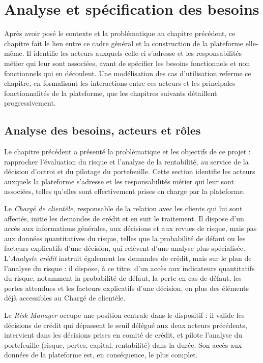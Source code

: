 \chapter{Analyse et spécification des besoins}

Après avoir posé le contexte et la problématique au chapitre précédent, ce chapitre fait le lien entre ce cadre général et la construction de la plateforme elle-même. Il identifie les acteurs auxquels celle-ci s'adresse et les responsabilités métier qui leur sont associées, avant de spécifier les besoins fonctionnels et non fonctionnels qui en découlent. Une modélisation des cas d'utilisation referme ce chapitre, en formalisant les interactions entre ces acteurs et les principales fonctionnalités de la plateforme, que les chapitres suivants détaillent progressivement.

\section{Analyse des besoins, acteurs et rôles}

Le chapitre précédent a présenté la problématique et les objectifs de ce projet : rapprocher l'évaluation du risque et l'analyse de la rentabilité, au service de la décision d'octroi et du pilotage du portefeuille. Cette section identifie les acteurs auxquels la plateforme s'adresse et les responsabilités métier qui leur sont associées, telles qu'elles sont effectivement prises en charge par la plateforme.

Le \emph{Chargé de clientèle}, responsable de la relation avec les clients qui lui sont affectés, initie les demandes de crédit et en suit le traitement. Il dispose d'un accès aux informations générales, aux décisions et aux revues de risque, mais pas aux données quantitatives du risque, telles que la probabilité de défaut ou les facteurs explicatifs d'une décision, qui relèvent d'une analyse plus spécialisée. L'\emph{Analyste crédit} instruit également les demandes de crédit, mais sur le plan de l'analyse du risque : il dispose, à ce titre, d'un accès aux indicateurs quantitatifs du risque, notamment la probabilité de défaut, la perte en cas de défaut, les pertes attendues et les facteurs explicatifs d'une décision, en plus des éléments déjà accessibles au Chargé de clientèle.

Le \emph{Risk Manager} occupe une position centrale dans le dispositif : il valide les décisions de crédit qui dépassent le seuil délégué aux deux acteurs précédents, intervient dans les décisions prises en comité de crédit, et pilote l'analyse du portefeuille (risque, pertes, capital, rentabilité) dans la durée. Son accès aux données de la plateforme est, en conséquence, le plus complet.

